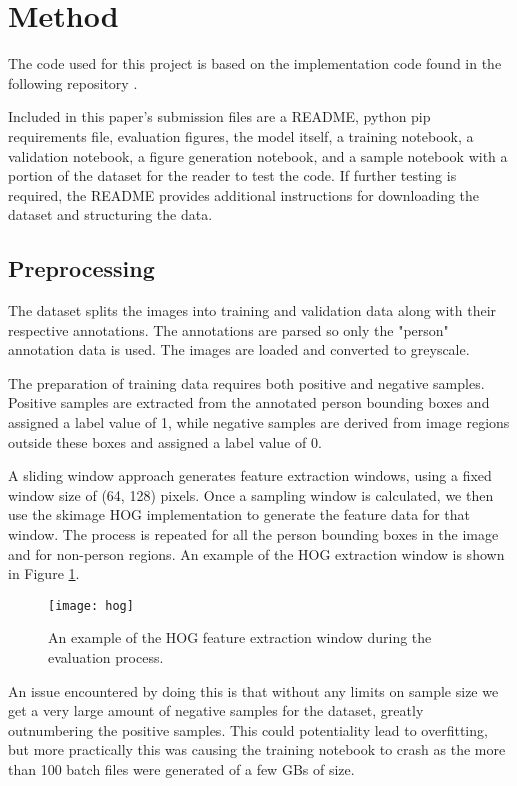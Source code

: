 \section{Method}

The code used for this project is based on the implementation code found in the following repository \cite{plvs2023hogdetection}.

Included in this paper's submission files are a README, python pip requirements file, evaluation figures, the model itself, a training notebook, a validation notebook, a figure generation notebook, and a sample notebook with a portion of the dataset for the reader to test the code.
If further testing is required, the README provides additional instructions for downloading the dataset and structuring the data.

\subsection{Preprocessing}

The dataset splits the images into training and validation data along with their respective annotations. 
The annotations are parsed so only the "person" annotation data is used.
The images are loaded and converted to greyscale.

The preparation of training data requires both positive and negative samples. 
Positive samples are extracted from the annotated person bounding boxes and assigned a label value of 1, while negative samples are derived from image regions outside these boxes and assigned a label value of 0. 

A sliding window approach generates feature extraction windows, using a fixed window size of (64, 128) pixels.
Once a sampling window is calculated, we then use the skimage \cite{vanderwalt2014scikit} HOG implementation to generate the feature data for that window.
The process is repeated for all the person bounding boxes in the image and for non-person regions. 
An example of the HOG extraction window is shown in Figure \ref{fig:hog_example}.

\begin{figure}[htbp]
  \centering
  \texttt{[image: hog]}
  \caption{An example of the HOG feature extraction window during the evaluation process.}
  \label{fig:hog_example}
\end{figure}

An issue encountered by doing this is that without any limits on sample size we get a very large amount of negative samples for the dataset, greatly outnumbering the positive samples.
This could potentiality lead to overfitting, but more practically this was causing the training notebook to crash as the more than 100 batch files were generated of a few GBs of size. 

